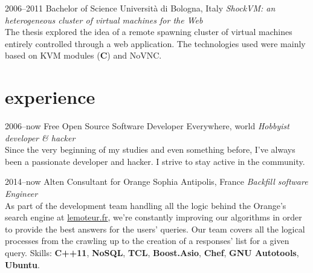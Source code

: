 \documentclass[]{friggeri-cv}
\begin{document}
\begin{entrylist}
  \entry
      {2006--2011}
      {Bachelor {\normalfont of Science}}
      {Universit\`a di Bologna, Italy}
      {\emph{ShockVM: an heterogeneous cluster of virtual machines for the Web}
        \\
        The thesis explored the idea of a remote spawning cluster of virtual
        machines entirely controlled through a web application. The technologies
        used were mainly based on KVM modules (\textbf{C}) and NoVNC.}
\end{entrylist}


\section{experience}

\begin{entrylist}
  \entry
      {2006--now}
      {Free Open Source Software Developer}
      {Everywhere, world}
      {\emph{Hobbyist developer \& hacker} \\
        Since the very beginning of my studies and even something before, I've
        always been a passionate developer and hacker.  I strive to stay active
        in the community.}
\end{entrylist}

\begin{entrylist}
  \entry
      {2014--now}
      {Alten Consultant for Orange}
      {Sophia Antipolis, France}
      {\emph{Backfill software Engineer} \\
        As part of the development team handling all the logic behind the
        Orange's search engine at \href{http://lemoteur.fr}{lemoteur.fr}, we're
        constantly improving our algorithms in order to provide the best answers
        for the users' queries. Our team covers all the logical processes from
        the crawling up to the creation of a responses' list for a given query.
        Skills: \textbf{C++11}, \textbf{NoSQL}, \textbf{TCL},
        \textbf{Boost.Asio}, \textbf{Chef}, \textbf{GNU Autotools},
        \textbf{Ubuntu}.
      }
\end{entrylist}
\end{document}
